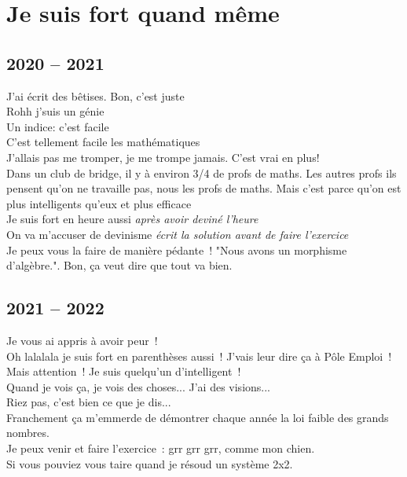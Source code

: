 \documentclass[french, a4paper, openany]{book}
\begin{document}
\section*{Je suis fort quand même}

	\subsection*{2020 -- 2021}
		\noindent \og J'ai écrit des bêtises. Bon, c'est juste \fg \\
		\og Rohh j'suis un génie \fg \\
		\og Un indice: c'est facile \fg \\
		\og C'est tellement facile les mathématiques \fg \\
		\og J'allais pas me tromper, je me trompe jamais. C'est vrai en plus! \fg \\
		\og Dans un club de bridge, il y à environ 3/4 de profs de maths. Les autres profs ils pensent qu'on ne travaille pas, nous les profs de maths. Mais c'est parce qu'on est plus intelligents qu'eux et plus efficace \fg \\
		\og Je suis fort en heure aussi \fg \emph{après avoir deviné l'heure} \\
		\og On va m'accuser de devinisme \fg \emph{écrit la solution avant de faire l'exercice} \\
		\og Je peux vous la faire de manière pédante~! "Nous avons un morphisme d'algèbre.". Bon, ça veut dire que tout va bien. \fg \\
		
	\subsection*{2021 -- 2022}
		\noindent \og Je vous ai appris à avoir peur~! \fg \\
		\og Oh lalalala je suis fort en parenthèses aussi~! J'vais leur dire ça à Pôle Emploi~! \fg \\
		\og Mais attention~! Je suis quelqu'un d'intelligent~! \fg \\
		\og Quand je vois ça, je vois des choses... J'ai des visions... \fg \\
		\og Riez pas, c'est bien ce que je dis... \fg \\
		\og Franchement ça m'emmerde de démontrer chaque année la loi faible des grands nombres. \fg \\
		\og Je peux venir et faire l'exercice~: grr grr grr, comme mon chien. \fg \\
		\og Si vous pouviez vous taire quand je résoud un système 2x2. \fg \\
\end{document}
